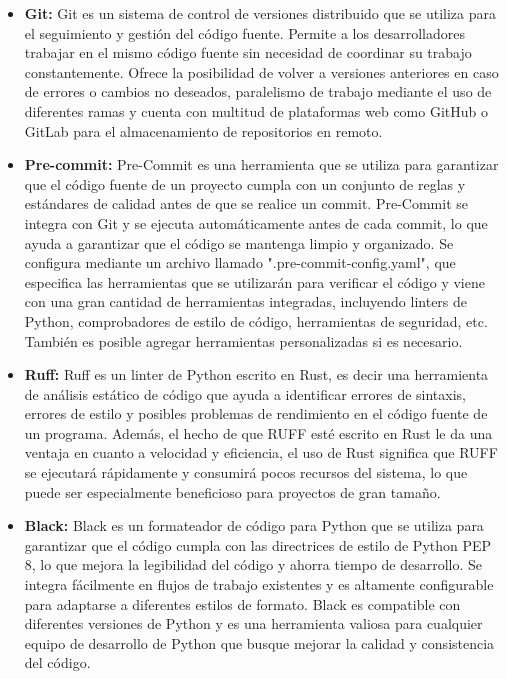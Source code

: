 \begin{itemize}
    \item \textbf{Git: } Git\cite{Git} es un sistema de control de versiones distribuido que se utiliza para el 
    seguimiento y gestión del código fuente. Permite a los desarrolladores trabajar en el mismo código fuente 
    sin necesidad de coordinar su trabajo constantemente. Ofrece la posibilidad de volver a versiones anteriores en 
    caso de errores o cambios no deseados, paralelismo de trabajo mediante el uso de diferentes ramas y cuenta 
    con multitud de plataformas web como GitHub o GitLab para el almacenamiento de repositorios en remoto.

    \item \textbf{Pre-commit: } Pre-Commit\cite{pre-commit} es una herramienta que se utiliza para garantizar que el código 
    fuente de un proyecto cumpla con un conjunto de reglas y estándares de calidad antes de que se realice 
    un commit. Pre-Commit se integra con Git y se ejecuta automáticamente antes de cada commit, lo que ayuda 
    a garantizar que el código se mantenga limpio y organizado. Se configura mediante un archivo llamado 
    ".pre-commit-config.yaml", que especifica las herramientas que se utilizarán para verificar el código 
    y viene con una gran cantidad de herramientas integradas, incluyendo linters de Python, comprobadores 
    de estilo de código, herramientas de seguridad, etc. También es posible agregar herramientas 
    personalizadas si es necesario.

    \item \textbf{Ruff:} Ruff\cite{Ruff} es un linter de Python escrito en Rust, es decir una herramienta de 
    análisis estático de código que ayuda a identificar errores de sintaxis, errores de estilo y posibles 
    problemas de rendimiento en el código fuente de un programa. Además, el hecho de que RUFF esté escrito 
    en Rust le da una ventaja en cuanto a velocidad y eficiencia, el uso de Rust significa que RUFF se 
    ejecutará rápidamente y consumirá pocos recursos del sistema, lo que puede ser especialmente beneficioso 
    para proyectos de gran tamaño.

    \item \textbf{Black: } Black\cite{Black} es un formateador de código para Python que se utiliza para garantizar
    que el código cumpla con las directrices de estilo de Python PEP 8, lo que mejora la legibilidad 
    del código y ahorra tiempo de desarrollo. Se integra fácilmente en flujos de trabajo existentes 
    y es altamente configurable para adaptarse a diferentes estilos de formato. Black es compatible 
    con diferentes versiones de Python y es una herramienta valiosa para cualquier equipo de desarrollo 
    de Python que busque mejorar la calidad y consistencia del código.


\end{itemize}
